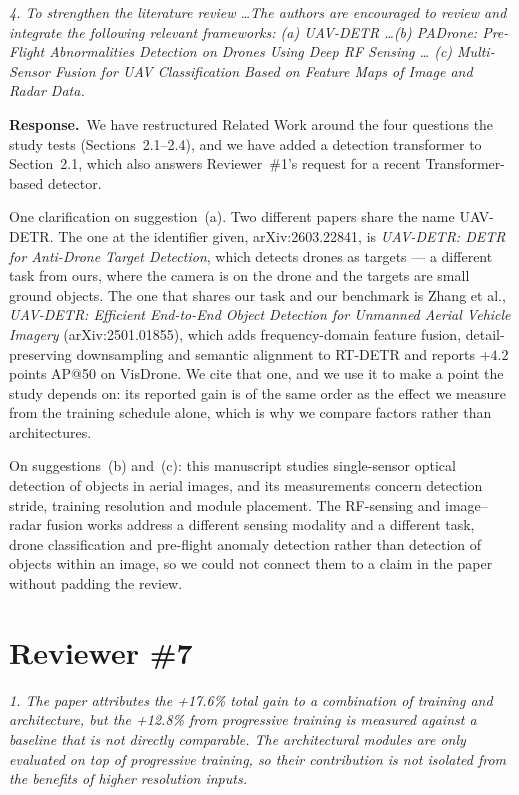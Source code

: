 \documentclass[11pt, a4paper]{article}
\newcommand{\point}[1]{\medskip\noindent\textit{#1}\par}
\newcommand{\reply}{\textbf{Response.}\ }
\begin{document}
\point{4. To strengthen the literature review \dots The authors are encouraged to
review and integrate the following relevant frameworks: (a) UAV-DETR \dots (b)
PADrone: Pre-Flight Abnormalities Detection on Drones Using Deep RF Sensing \dots
(c) Multi-Sensor Fusion for UAV Classification Based on Feature Maps of Image and
Radar Data.}

\reply We have restructured Related Work around the four questions the study tests
(Sections~2.1--2.4), and we have added a detection transformer to Section~2.1,
which also answers Reviewer~\#1's request for a recent Transformer-based
detector.

One clarification on suggestion~(a). Two different papers share the name
UAV-DETR. The one at the identifier given, arXiv:2603.22841, is
\textit{UAV-DETR: DETR for Anti-Drone Target Detection}, which detects drones as
targets --- a different task from ours, where the camera is on the drone and the
targets are small ground objects. The one that shares our task and our benchmark
is Zhang et al., \textit{UAV-DETR: Efficient End-to-End Object Detection for
Unmanned Aerial Vehicle Imagery} (arXiv:2501.01855), which adds frequency-domain
feature fusion, detail-preserving downsampling and semantic alignment to RT-DETR
and reports $+4.2$ points AP@50 on VisDrone. We cite that one, and we use it to
make a point the study depends on: its reported gain is of the same order as the
effect we measure from the training schedule alone, which is why we compare
factors rather than architectures.

On suggestions~(b) and~(c): this manuscript studies single-sensor optical
detection of objects in aerial images, and its measurements concern detection
stride, training resolution and module placement. The RF-sensing and image--radar
fusion works address a different sensing modality and a different task, drone
classification and pre-flight anomaly detection rather than detection of objects
within an image, so we could not connect them to a claim in the paper without
padding the review.

\section*{Reviewer \#7}

\point{1. The paper attributes the +17.6\% total gain to a combination of training
and architecture, but the +12.8\% from progressive training is measured against a
baseline that is not directly comparable. The architectural modules are only
evaluated on top of progressive training, so their contribution is not isolated
from the benefits of higher resolution inputs.}
\end{document}
